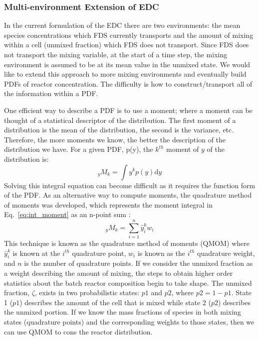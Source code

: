 \subsubsection{Multi-environment Extension of EDC}
In the current formulation of the EDC there are two environments: the mean species concentrations which FDS currently transports and the amount of mixing within a cell (unmixed fraction) which FDS does not transport. Since FDS does not transport the mixing variable, at the start of a time step, the mixing environment is assumed to be at its mean value in the unmixed state. We would like to extend this approach to more mixing environments and eventually build PDFs of reactor concentration. The difficulty is how to construct/transport all of the information within a PDF.

One efficient way to describe a PDF is to use a moment; where a moment can be thought of a statistical descriptor of the distribution. The first moment of a distribution is the mean of the distribution, the second is the variance, etc. Therefore, the more moments we know, the better the description of the distribution we have. For a given PDF, p(y), the $k^{th}$ moment of $y$ of the distribution is:
\begin{equation}\label{eq:int_moment}
_{y}M_{k} = \int y^{k}p(y)\mathrm{d}y
\end{equation}
Solving this integral equation can become difficult as it requires the function form of the PDF. As an alternative way to compute moments, the quadrature method of moments was developed, which represents the moment integral in Eq.~\ref{eq:int_moment} as an n-point sum \cite{mcgraw:1997}:
\begin{equation}\label{eq:qmom}
_{y}M_{k}=\displaystyle \sum_{i=1}^{n} \hat y_{i}^{k} w_{i}
\end{equation}
This technique is known as the quadrature method of moments (QMOM) where  $\hat y_i^k$ is known at the $i^{th}$ quadrature point, $w_i$ is known as the $i^{th}$ quadrature weight, and $n$ is the number of quadrature points. If we consider the unmixed fraction as a weight describing the amount of mixing, the steps to obtain higher order statistics about the batch reactor composition begin to take shape. The unmixed fraction, $\zeta$, exists in two probabilistic states: $p1$ and $p2$, where $p2 = 1-p1$. State 1 ($p1$) describes the amount of the cell that is mixed while state 2 ($p2$) describes the unmixed portion. If we know the mass fractions of species in both mixing states (quadrature points) and the corresponding weights to those states, then we can use QMOM to cons the reactor distribution.

